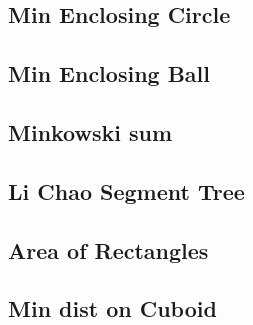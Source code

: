 \documentclass[a4paper,10pt,twocolumn,oneside]{article}
\begin{document}
% 

\subsection{Min Enclosing Circle}


\subsection{Min Enclosing Ball}


%

\subsection{Minkowski sum}


% 

%

\subsection{Li Chao Segment Tree}


\subsection{Area of Rectangles}


\subsection{Min dist on Cuboid}

\end{document}
